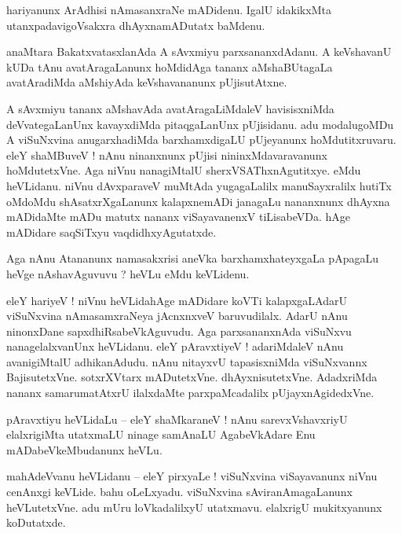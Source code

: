 \documentclass{article}
\begin{document}
\begin{mn}%
hariyanunx ArAdhisi nAmasanxraNe mADidenu. IgalU idakikxMta utanxpadavigoVsakxra dhAyxnamADutatx 
baMdenu. 
\end{mn}

\begin{mn}%
anaMtara BakatxvatasxlanAda A sAvxmiyu parxsananxdAdanu. A keVshavanU kUDa tAnu avatAragaLanunx 
hoMdidAga tananx aMshaBUtagaLa avatAradiMda aMshiyAda keVshavananunx pUjisutAtxne.
\end{mn}

\begin{mn}%
A sAvxmiyu tananx aMshavAda avatAragaLiMdaleV havisisxniMda deVvategaLanUnx kavayxdiMda 
pitaqgaLanUnx pUjisidanu. adu modalugoMDu A viSuNxvina anugarxhadiMda barxhamxdigaLU pUjeyanunx 
hoMdutitxruvaru. eleY shaMBuveV ! nAnu ninanxnunx pUjisi nininxMdavaravanunx hoMdutetxVne. Aga 
niVnu nanagiMtalU sherxVSAThxnAgutitxye. eMdu heVLidanu. niVnu dAvxparaveV muMtAda yugagaLalilx 
manuSayxralilx hutiTx oMdoMdu shAsatxrXgaLanunx kalapxnemADi janagaLu nananxnunx dhAyxna mADidaMte 
mADu matutx nananx viSayavanenxV tiLisabeVDa. hAge mADidare saqSiTxyu vaqdidhxyAgutatxde.
\end{mn}

\begin{mn}%
Aga nAnu Atananunx namasakxrisi aneVka barxhamxhateyxgaLa pApagaLu heVge nAshavAguvuvu ? heVLu eMdu 
keVLidenu.
\end{mn}

\begin{mn}%
eleY hariyeV ! niVnu heVLidahAge mADidare koVTi kalapxgaLAdarU viSuNxvina nAmasamxraNeya jAcnxnxveV 
baruvudilalx. AdarU nAnu ninonxDane sapxdhiRsabeVkAguvudu. Aga parxsananxnAda viSuNxvu 
nanagelalxvanUnx heVLidanu. eleY pAravxtiyeV ! adariMdaleV nAnu avanigiMtalU adhikanAdudu. nAnu 
nitayxvU tapasisxniMda viSuNxvannx BajisutetxVne. sotxrXVtarx mADutetxVne. dhAyxnisutetxVne. 
AdadxriMda nananx samarumatAtxrU ilalxdaMte parxpaMcadalilx pUjayxnAgidedxVne.
\end{mn}

\begin{mn}%
pAravxtiyu heVLidaLu -- eleY shaMkaraneV ! nAnu sarevxVshavxriyU elalxrigiMta utatxmaLU ninage 
samAnaLU AgabeVkAdare Enu mADabeVkeMbudanunx heVLu.
\end{mn}

\begin{mn}%
mahAdeVvanu heVLidanu -- eleY pirxyaLe ! viSuNxvina viSayavanunx niVnu cenAnxgi keVLide. bahu 
oLeLxyadu. viSuNxvina sAviranAmagaLanunx heVLutetxVne. adu mUru loVkadalilxyU utatxmavu. elalxrigU 
mukitxyanunx koDutatxde.
\end{mn}
\end{document}
